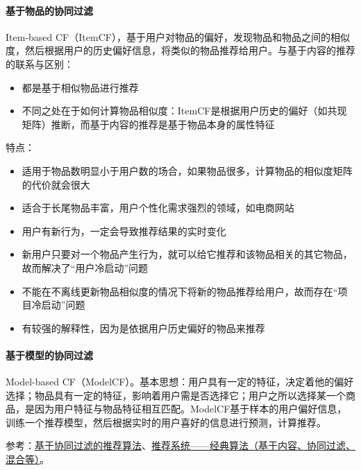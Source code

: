 \paragraph{基于物品的协同过滤}
Item-based CF（ItemCF），基于用户对物品的偏好，发现物品和物品之间的相似度，然后根据用户的历史偏好信息，将类似的物品推荐给用户。与基于内容的推荐的联系与区别：
\begin{itemize}
	\item 都是基于相似物品进行推荐
	\item 不同之处在于如何计算物品相似度：ItemCF是根据用户历史的偏好（如共现矩阵）推断，而基于内容的推荐是基于物品本身的属性特征
\end{itemize}
特点：
\begin{itemize}
	\item 适用于物品数明显小于用户数的场合，如果物品很多，计算物品的相似度矩阵的代价就会很大
	\item 适合于长尾物品丰富，用户个性化需求强烈的领域，如电商网站
	\item 用户有新行为，一定会导致推荐结果的实时变化
	\item 新用户只要对一个物品产生行为，就可以给它推荐和该物品相关的其它物品，故而解决了“用户冷启动”问题
	\item 不能在不离线更新物品相似度的情况下将新的物品推荐给用户，故而存在“项目冷启动”问题
	\item 有较强的解释性，因为是依据用户历史偏好的物品来推荐
\end{itemize}


\paragraph{基于模型的协同过滤}
Model-based CF（ModelCF）。基本思想：用户具有一定的特征，决定着他的偏好选择；物品具有一定的特征，影响着用户需是否选择它；用户之所以选择某一个商品，是因为用户特征与物品特征相互匹配。ModelCF基于样本的用户偏好信息，训练一个推荐模型，然后根据实时的用户喜好的信息进行预测，计算推荐。

参考：\href{https://www.cnblogs.com/shengyang17/p/11516532.html}{基于协同过滤的推荐算法}、\href{https://zhuanlan.zhihu.com/p/108759393}{推荐系统——经典算法（基于内容、协同过滤、混合等）}。


